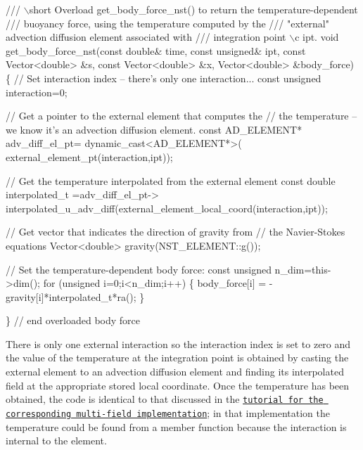  
\begin{DoxyCodeInclude}
  \textcolor{comment}{/// \(\backslash\)short Overload get\_body\_force\_nst() to return the temperature-dependent}
\textcolor{comment}{  /// buoyancy force, using the temperature computed by the }
\textcolor{comment}{}\textcolor{comment}{  /// "external" advection diffusion element associated with }
\textcolor{comment}{}\textcolor{comment}{  /// integration point \(\backslash\)c ipt.}
\textcolor{comment}{}  \textcolor{keywordtype}{void} get\_body\_force\_nst(\textcolor{keyword}{const} \textcolor{keywordtype}{double}& time, \textcolor{keyword}{const} \textcolor{keywordtype}{unsigned}& ipt, 
                          \textcolor{keyword}{const} Vector<double> &s, \textcolor{keyword}{const} Vector<double> &x, 
                          Vector<double> &body\_force)
  \{   
   \textcolor{comment}{// Set interaction index -- there's only one interaction...}
   \textcolor{keyword}{const} \textcolor{keywordtype}{unsigned} interaction=0;
   
   \textcolor{comment}{// Get a pointer to the external element that computes the}
   \textcolor{comment}{// the temperature -- we know it's an advection diffusion element.}
   \textcolor{keyword}{const} AD\_ELEMENT* adv\_diff\_el\_pt=
    \textcolor{keyword}{dynamic\_cast<}AD\_ELEMENT*\textcolor{keyword}{>}(
     external\_element\_pt(interaction,ipt));
   
   \textcolor{comment}{// Get the temperature interpolated from the external element}
   \textcolor{keyword}{const} \textcolor{keywordtype}{double} interpolated\_t =adv\_diff\_el\_pt->
    interpolated\_u\_adv\_diff(external\_element\_local\_coord(interaction,ipt));
   
   \textcolor{comment}{// Get vector that indicates the direction of gravity from}
   \textcolor{comment}{// the Navier-Stokes equations}
   Vector<double> gravity(NST\_ELEMENT::g());
   
   \textcolor{comment}{// Set the temperature-dependent body force:}
   \textcolor{keyword}{const} \textcolor{keywordtype}{unsigned} n\_dim=this->dim();
   \textcolor{keywordflow}{for} (\textcolor{keywordtype}{unsigned} i=0;i<n\_dim;i++)
    \{
     body\_force[i] = -gravity[i]*interpolated\_t*ra();
    \}
   
  \} \textcolor{comment}{// end overloaded body force}

\end{DoxyCodeInclude}


There is only one external interaction so the interaction index is set to zero and the value of the temperature at the integration point is obtained by casting the external element to an advection diffusion element and finding its interpolated field at the appropriate stored local coordinate. Once the temperature has been obtained, the code is identical to that discussed in the \href{../../b_convection/html/index.html}{\tt tutorial for the corresponding multi-\/field implementation}; in that implementation the temperature could be found from a member function because the interaction is internal to the element.

